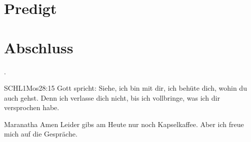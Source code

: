 \documentclass{../../inc/mybib}
\begin{document}
\section{Predigt}






\section{Abschluss}

.

\beten{}

\begin{bibelbox}{SCHL}{1Mos}{28:15}
    Gott spricht: Siehe, ich bin mit dir,
    ich behüte dich, wohin du auch gehst.
    Denn ich verlasse dich nicht,
    bis ich vollbringe, was ich dir versprochen habe.
\end{bibelbox}

Maranatha Amen
Leider gibs am Heute nur noch Kapselkaffee. Aber ich freue mich auf die Gespräche.
\end{document}

